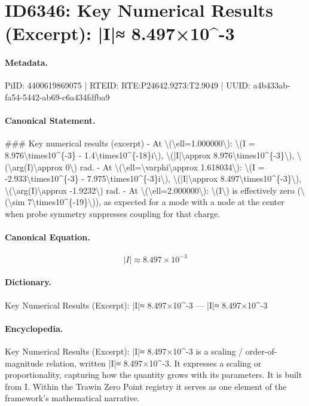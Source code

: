 \section*{ID6346: Key Numerical Results (Excerpt): |I|≈ 8.497×10\textasciicircum{}-3}
\paragraph{Metadata.}
PiID: 4400619869075 | RTEID: RTE:P24642.9273:T2.9049 | UUID: a4b433ab-fa54-5442-ab69-c6a434fdfba9

\paragraph{Canonical Statement.}
\#\#\# Key numerical results (excerpt) - At \textbackslash{}(\textbackslash{}ell=1.000000\textbackslash{}): \textbackslash{}(I = 8.976\textbackslash{}times10\textasciicircum{}\{-3\} - 1.4\textbackslash{}times10\textasciicircum{}\{-18\}i\textbackslash{}), \textbackslash{}(|I|\textbackslash{}approx 8.976\textbackslash{}times10\textasciicircum{}\{-3\}\textbackslash{}), \textbackslash{}(\textbackslash{}arg(I)\textbackslash{}approx 0\textbackslash{}) rad. - At \textbackslash{}(\textbackslash{}ell=\textbackslash{}varphi\textbackslash{}approx 1.618034\textbackslash{}): \textbackslash{}(I = -2.933\textbackslash{}times10\textasciicircum{}\{-3\} - 7.975\textbackslash{}times10\textasciicircum{}\{-3\}i\textbackslash{}), \textbackslash{}(|I|\textbackslash{}approx 8.497\textbackslash{}times10\textasciicircum{}\{-3\}\textbackslash{}), \textbackslash{}(\textbackslash{}arg(I)\textbackslash{}approx -1.9232\textbackslash{}) rad. - At \textbackslash{}(\textbackslash{}ell=2.000000\textbackslash{}): \textbackslash{}(I\textbackslash{}) is effectively zero (\textbackslash{}(\textbackslash{}sim 7\textbackslash{}times10\textasciicircum{}\{-19\}\textbackslash{})), as expected for a mode with a node at the center when probe symmetry suppresses coupling for that charge.

\paragraph{Canonical Equation.}
\[
|I|\approx 8.497\times10^{-3}
\]

\paragraph{Dictionary.}
Key Numerical Results (Excerpt): |I|≈ 8.497×10\textasciicircum{}-3 — |I|≈ 8.497×10\textasciicircum{}-3

\paragraph{Encyclopedia.}
Key Numerical Results (Excerpt): |I|≈ 8.497×10\textasciicircum{}-3 is a scaling / order-of-magnitude relation, written |I|≈ 8.497×10\textasciicircum{}-3. It expresses a scaling or proportionality, capturing how the quantity grows with its parameters. It is built from I. Within the Trawin Zero Point registry it serves as one element of the framework's mathematical narrative.
